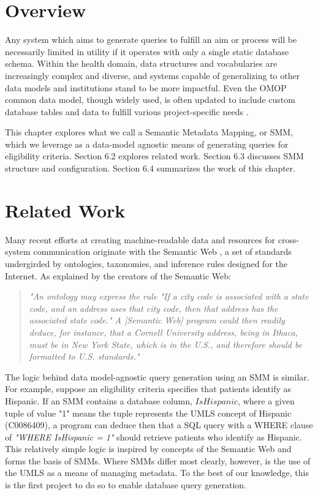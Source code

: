 \documentclass[../main.tex]{subfiles}
\begin{document}
\section{Overview}

Any system which aims to generate queries to fulfill an aim or process will be necessarily limited in utility if it operates with only a single static database schema. Within the health domain, data structures and vocabularies are increasingly complex and diverse, and systems capable of generalizing to other data models and institutions stand to be more impactful. Even the OMOP common data model, though widely used, is often updated to include custom database tables and data to fulfill various project-specific needs \cite{belenkaya2021extending, peng2021towards, zoch2021adaption, warner2019hemonc, zhou2013evaluation, shin2019genomic, kwon2019development}. 

This chapter explores what we call a Semantic Metadata Mapping, or SMM, which we leverage as a data-model agnostic means of generating queries for eligibility criteria. Section 6.2 explores related work. Section 6.3 discusses SMM structure and configuration. Section 6.4 summarizes the work of this chapter.

\section{Related Work}

Many recent efforts at creating machine-readable data and resources for cross-system communication originate with the Semantic Web \cite{berners2001semantic}, a set of standards undergirded by ontologies, taxonomies, and inference rules designed for the Internet. As explained by the creators of the Semantic Web:

\begin{quote}
\textit{"An ontology may express the rule "If a city code is associated with a state code, and an address uses that city code, then that address has the associated state code." A [Semantic Web] program could then readily deduce, for instance, that a Cornell University address, being in Ithaca, must be in New York State, which is in the U.S., and therefore should be formatted to U.S. standards."} \cite{berners2001semantic}
\end{quote}

The logic behind data model-agnostic query generation using an SMM is similar. For example, suppose an eligibility criteria specifies that patients identify as Hispanic. If an SMM contains a database column, $IsHispanic$, where a given tuple of value "1" means the tuple represents the UMLS concept of Hispanic (C0086409), a program can deduce then that a SQL query with a WHERE clause of \textit{"WHERE IsHispanic = 1"} should retrieve patients who identify as Hispanic. This relatively simple logic is inspired by concepts of the Semantic Web and forms the basis of SMMs. Where SMMs differ most clearly, however, is the use of the UMLS as a means of managing metadata. To the best of our knowledge, this is the first project to do so to enable database query generation.
\end{document}
